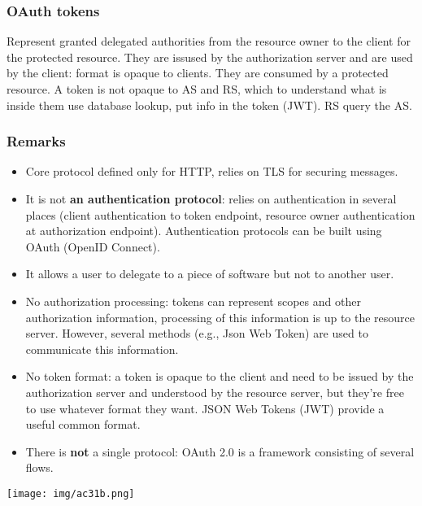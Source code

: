\documentclass[a4paper, 10pt, titlepage]{article}
\begin{document}
\subsubsection{OAuth tokens}
Represent granted delegated authorities from the resource owner to the client for the protected resource. They are issused by the authorization server and are used by the client: format is opaque to clients. They are consumed by a protected resource. A token is not opaque to AS and RS, which to understand what is inside them use database lookup, put info in the token (JWT). RS query the AS.

\subsubsection{Remarks}
\begin{itemize}
\item Core protocol defined only for HTTP, relies on TLS for securing messages.
\item It is not \textbf{an authentication protocol}: relies on authentication in several places (client authentication to token endpoint, resource owner authentication at authorization endpoint). Authentication protocols can be built using OAuth (OpenID Connect).
\item It allows a user to delegate to a piece of software but not to another user.
\item No authorization processing: tokens can represent scopes and other authorization information, processing of this information is up to the resource server. However, several methods (e.g., Json Web Token) are used to communicate this information.
\item No token format: a token is opaque to the client and need to be issued by the authorization server and understood by the resource server, but they’re free to use whatever format they want. JSON Web Tokens (JWT) provide a useful common format.
\item There is \textbf{not} a single protocol: OAuth 2.0 is a framework consisting of several flows.
\end{itemize}
\begin{center}
\texttt{[image: img/ac31b.png]}
\end{center}
\end{document}
